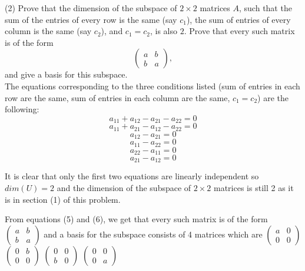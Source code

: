 \documentclass[12pt]{article}
\begin{document}
\medskip
(2)
Prove that the dimension of the subspace of $2\times 2$ matrices
$A$, such that the sum of the entries of every row is the same (say $c_1$),
the sum of entries of every column is the same (say $c_2$), and $c_1 =
c_2$, is also  $2$.
Prove that every such matrix is of the form
\[
\begin{pmatrix}
a & b  \\
b & a 
\end{pmatrix},
\]
and give a basis for this subspace.\\
The equations corresponding to the three conditions listed (sum of entries in each row are the same, sum of entries in each column are the same, $c_1 = c_2$) are the following:
\begin{equation}
a_{11} + a_{12} - a_{21} - a_{22} = 0
\end{equation}
\begin{equation}
a_{11} + a_{21} - a_{12} - a_{22} = 0
\end{equation}
\begin{equation}
a_{12} - a_{21}  = 0
\end{equation}
\begin{equation}
a_{11} - a_{22} = 0
\end{equation}
\begin{equation}
a_{22} - a_{11} = 0
\end{equation}
\begin{equation}
a_{21} - a_{12} = 0
\end{equation}

It is clear that only the first two equations are linearly independent so $dim(U)=2$ and the dimension of the subspace of $2 \times 2$ matrices is still 2 as it is in section (1) of this problem.

From equations (5) and (6), we get that every such matrix is of the form $\begin{pmatrix}
a & b \\ b& a
\end{pmatrix}$ and a basis for the subspace consists of 4 matrices which are $\begin{pmatrix}
a & 0 \\ 0& 0
\end{pmatrix}$ $\begin{pmatrix}
0 & b \\ 0& 0
\end{pmatrix}$
$\begin{pmatrix}
0 & 0 \\ b& 0
\end{pmatrix}$
$\begin{pmatrix}
0 & 0 \\ 0& a
\end{pmatrix}$
\end{document}
